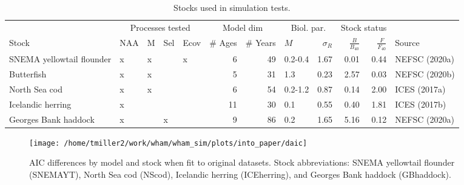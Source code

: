 \documentclass[]{article}
\begin{document}
\begin{landscape}
\begin{table}

\caption{\label{tab:stock-list}Stocks used in simulation tests.}
\centering
\begin{tabular}[t]{lllllrrlrrrl}
\toprule
\multicolumn{1}{c}{ } & \multicolumn{4}{c}{Processes tested} & \multicolumn{2}{c}{Model dim} & \multicolumn{2}{c}{Biol. par.} & \multicolumn{2}{c}{Stock status} \\
\cmidrule(l{3pt}r{3pt}){2-5} \cmidrule(l{3pt}r{3pt}){6-7} \cmidrule(l{3pt}r{3pt}){8-9} \cmidrule(l{3pt}r{3pt}){10-11}
Stock & NAA & M & Sel & Ecov & \# Ages & \# Years & $M$ & $\sigma_R$ & $\frac{B}{B_{40}}$ & $\frac{F}{F_{40}}$ & Source\\
\midrule
SNEMA yellowtail flounder & x & x &  & x & 6 & 49 & 0.2-0.4 & 1.67 & 0.01 & 0.44 & NEFSC (2020a)\\
Butterfish & x & x &  &  & 5 & 31 & 1.3 & 0.23 & 2.57 & 0.03 & NEFSC (2020b)\\
North Sea cod & x & x &  &  & 6 & 54 & 0.2-1.2 & 0.87 & 0.14 & 2.00 & ICES (2017a)\\
Icelandic herring & x &  &  &  & 11 & 30 & 0.1 & 0.55 & 0.40 & 1.81 & ICES (2017b)\\
Georges Bank haddock & x &  & x &  & 9 & 86 & 0.2 & 1.65 & 5.16 & 0.12 & NEFSC (2020a)\\
\bottomrule
\end{tabular}
\end{table}
\end{landscape}

\pagebreak

\begin{landscape}
\begin{figure}

{\centering \texttt{[image: /home/tmiller2/work/wham/wham\_sim/plots/into\_paper/daic]} 

}

\caption{AIC differences by model and stock when fit to original datasets. Stock abbreviations: SNEMA yellowtail flounder (SNEMAYT), North Sea cod (NScod), Icelandic herring (ICEherring), and Georges Bank haddock (GBhaddock).}\label{fig:daic}
\end{figure}
\end{landscape}

\pagebreak
\end{document}

